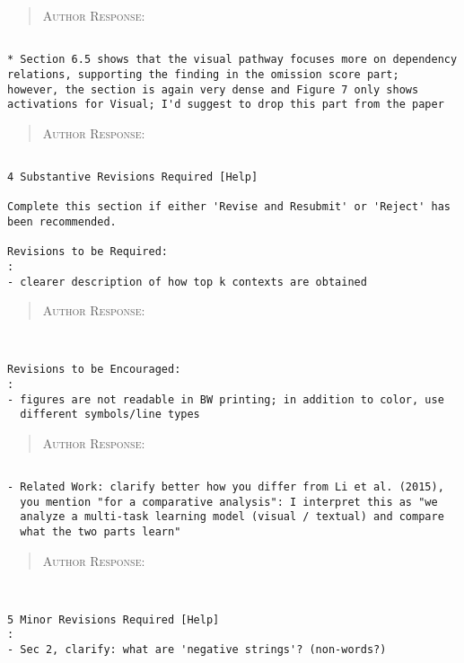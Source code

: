 \begin{quote}
\textsc{Author Response:}  
\end{quote}
\begin{verbatim}

* Section 6.5 shows that the visual pathway focuses more on dependency
relations, supporting the finding in the omission score part;
however, the section is again very dense and Figure 7 only shows
activations for Visual; I'd suggest to drop this part from the paper

\end{verbatim}  
\begin{quote}
\textsc{Author Response:}  
\end{quote}
\begin{verbatim}

4 Substantive Revisions Required [Help]

Complete this section if either 'Revise and Resubmit' or 'Reject' has
been recommended.

Revisions to be Required:
: 
- clearer description of how top k contexts are obtained
\end{verbatim}  
\begin{quote}
\textsc{Author Response:}  
\end{quote}
\begin{verbatim}


Revisions to be Encouraged:
: 
- figures are not readable in BW printing; in addition to color, use
  different symbols/line types
\end{verbatim}  
\begin{quote}
\textsc{Author Response:}  
\end{quote}
\begin{verbatim}

- Related Work: clarify better how you differ from Li et al. (2015),
  you mention "for a comparative analysis": I interpret this as "we
  analyze a multi-task learning model (visual / textual) and compare
  what the two parts learn"
\end{verbatim}  
\begin{quote}
\textsc{Author Response:}  
\end{quote}
\begin{verbatim}


5 Minor Revisions Required [Help]
: 
- Sec 2, clarify: what are 'negative strings'? (non-words?)
\end{verbatim}  
